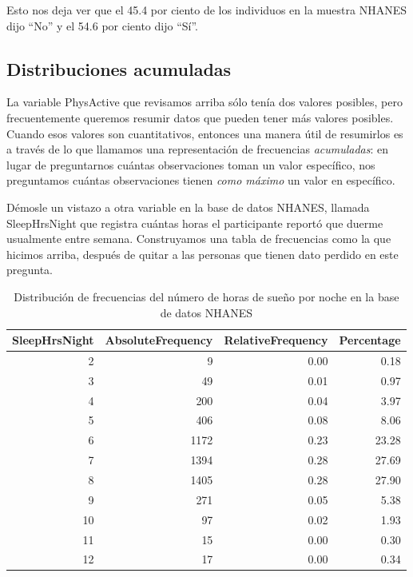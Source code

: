 \documentclass[
  12pt,
]{book}
\begin{document}
Esto nos deja ver que el 45.4 por ciento de los individuos en la muestra NHANES dijo ``No'' y el 54.6 por ciento dijo ``Sí''.

\hypertarget{cumulative-distributions}{%
\subsection{Distribuciones acumuladas}\label{cumulative-distributions}}

La variable PhysActive que revisamos arriba sólo tenía dos valores posibles, pero frecuentemente queremos resumir datos que pueden tener más valores posibles. Cuando esos valores son cuantitativos, entonces una manera útil de resumirlos es a través de lo que llamamos una representación de frecuencias \emph{acumuladas}: en lugar de preguntarnos cuántas observaciones toman un valor específico, nos preguntamos cuántas observaciones tienen \emph{como máximo} un valor en específico.

Démosle un vistazo a otra variable en la base de datos NHANES, llamada SleepHrsNight que registra cuántas horas el participante reportó que duerme usualmente entre semana. Construyamos una tabla de frecuencias como la que hicimos arriba, después de quitar a las personas que tienen dato perdido en este pregunta.

\begin{table}

\caption{\label{tab:unnamed-chunk-7}Distribución de frecuencias del número de horas de sueño por noche en la base de datos NHANES}
\centering
\begin{tabular}[t]{r|r|r|r}
\hline
SleepHrsNight & AbsoluteFrequency & RelativeFrequency & Percentage\\
\hline
2 & 9 & 0.00 & 0.18\\
\hline
3 & 49 & 0.01 & 0.97\\
\hline
4 & 200 & 0.04 & 3.97\\
\hline
5 & 406 & 0.08 & 8.06\\
\hline
6 & 1172 & 0.23 & 23.28\\
\hline
7 & 1394 & 0.28 & 27.69\\
\hline
8 & 1405 & 0.28 & 27.90\\
\hline
9 & 271 & 0.05 & 5.38\\
\hline
10 & 97 & 0.02 & 1.93\\
\hline
11 & 15 & 0.00 & 0.30\\
\hline
12 & 17 & 0.00 & 0.34\\
\hline
\end{tabular}
\end{table}
\end{document}

